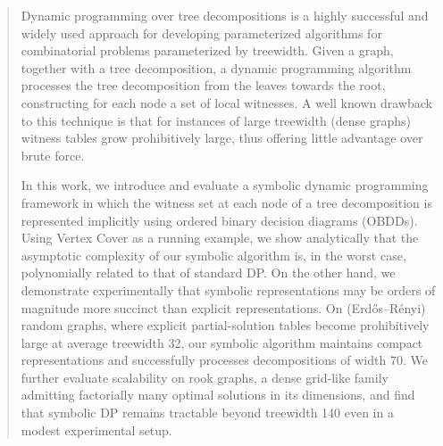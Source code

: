 
\begin{abstract}
    Dynamic programming over tree decompositions is a highly successful and widely used approach for developing parameterized algorithms for combinatorial problems parameterized by treewidth. Given a graph, together with a tree decomposition, a dynamic programming algorithm processes the tree decomposition from the leaves towards the root, constructing for each node a set of local witnesses. 
    A well known drawback to this technique is that for instances of large treewidth (dense graphs) witness tables grow prohibitively large, thus offering little advantage over brute force.

    In this work, we introduce and evaluate a symbolic dynamic programming framework in which the witness set at each node of a tree decomposition is represented implicitly using ordered binary decision diagrams (OBDDs).
    Using {\sc Vertex Cover} as a running example, we show analytically that the asymptotic complexity of our symbolic algorithm is, in the worst case, polynomially related to that of standard DP.  
    On the other hand, we demonstrate experimentally that symbolic representations may be orders of magnitude more succinct than explicit representations. 
    On (Erd\H{o}s--R\'enyi) random graphs, where explicit partial-solution tables become prohibitively large at average treewidth 32, our symbolic algorithm maintains compact representations and successfully processes decompositions of width 70.
    We further evaluate scalability on rook graphs, a dense grid-like family admitting factorially many optimal solutions in its dimensions, and find that symbolic DP remains tractable beyond treewidth 140 even in a modest experimental setup.
\end{abstract}
